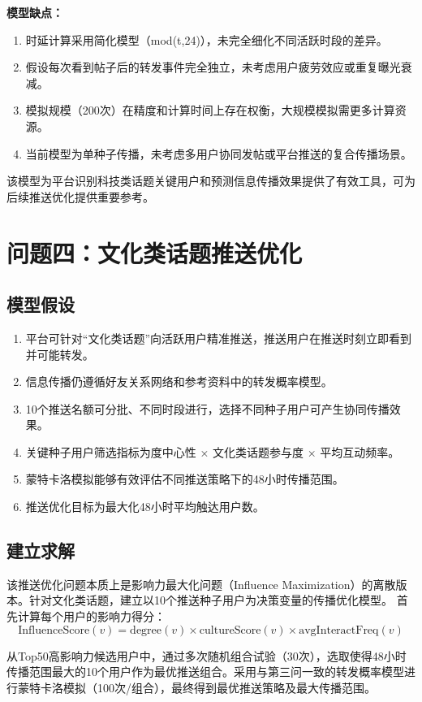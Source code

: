 \documentclass[a4paper,12pt]{ctexart}
\begin{document}
\textbf{模型缺点：}
\begin{enumerate}
    \item 时延计算采用简化模型（mod(t,24)），未完全细化不同活跃时段的差异。
    \item 假设每次看到帖子后的转发事件完全独立，未考虑用户疲劳效应或重复曝光衰减。
    \item 模拟规模（200次）在精度和计算时间上存在权衡，大规模模拟需更多计算资源。
    \item 当前模型为单种子传播，未考虑多用户协同发帖或平台推送的复合传播场景。
\end{enumerate}

该模型为平台识别科技类话题关键用户和预测信息传播效果提供了有效工具，可为后续推送优化提供重要参考。


\section{问题四：文化类话题推送优化}
\subsection{模型假设}
\begin{enumerate}
    \item 平台可针对“文化类话题”向活跃用户精准推送，推送用户在推送时刻立即看到并可能转发。
    \item 信息传播仍遵循好友关系网络和参考资料中的转发概率模型。
    \item 10个推送名额可分批、不同时段进行，选择不同种子用户可产生协同传播效果。
    \item 关键种子用户筛选指标为度中心性 × 文化类话题参与度 × 平均互动频率。
    \item 蒙特卡洛模拟能够有效评估不同推送策略下的48小时传播范围。
    \item 推送优化目标为最大化48小时平均触达用户数。
\end{enumerate}

\subsection{建立求解}
该推送优化问题本质上是影响力最大化问题（Influence Maximization）的离散版本\cite{ref4}。针对文化类话题，建立以10个推送种子用户为决策变量的传播优化模型。  
首先计算每个用户的影响力得分：
\[
\text{InfluenceScore}(v) = \text{degree}(v) \times \text{cultureScore}(v) \times \text{avgInteractFreq}(v)
\]

从Top50高影响力候选用户中，通过多次随机组合试验（30次），选取使得48小时传播范围最大的10个用户作为最优推送组合。采用与第三问一致的转发概率模型进行蒙特卡洛模拟（100次/组合），最终得到最优推送策略及最大传播范围。
\end{document}
